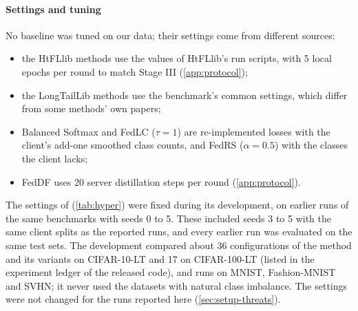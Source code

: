 \paragraph{Settings and tuning} No baseline was tuned on our data; their settings come from different sources:
\begin{itemize}
\item the HtFLlib methods use the values of HtFLlib's run scripts, with 5 local epochs per round to match Stage III
(\cref{app:protocol});
\item the LongTailLib methods use the benchmark's common settings, which differ from some methods' own papers;
\item Balanced Softmax and FedLC ($\tau=1$) are re-implemented losses with the client's add-one smoothed class
counts, and FedRS ($\alpha=0.5$) with the classes the client lacks;
\item FedDF uses 20 server distillation steps per round (\cref{app:protocol}).
\end{itemize}
The settings of \ours (\cref{tab:hyper}) were fixed during its development, on earlier runs of the same benchmarks
with seeds 0 to 5. These included seeds 3 to 5 with the same client splits as the reported runs, and every earlier
run was evaluated on the same test sets. The development compared about 36 configurations of the method and its
variants on CIFAR-10-LT and 17 on CIFAR-100-LT (listed in the experiment ledger of the released code), and runs on MNIST, Fashion-MNIST and
SVHN; it never used the datasets with natural class imbalance. The settings were not changed for the runs
reported here (\cref{sec:setup-threats}).

